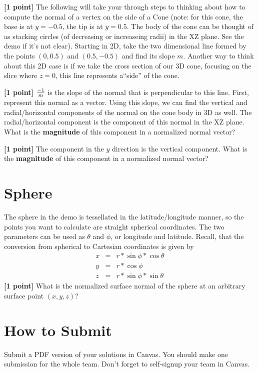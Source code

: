 \documentclass[10pt,twocolumn]{article}
\begin{document}
{\bf [1 point]} The following will take your through steps to thinking about how to compute the normal of a vertex on the side of a Cone (note: for this cone, the base is at $y=-0.5$, the tip is at $y=0.5$. The body of the cone can be thought of as stacking circles (of decreasing or increaseing radii) in the XZ plane. See the demo if it's not clear). Starting in 2D, take the two dimensional line formed by the points $(0, 0.5)$ and $(0.5, -0.5)$ and find its slope $m$. Another way to think about this 2D case is if we take the cross section of our 3D cone, focusing on the slice where $z=0$, this line represents a``side'' of the cone.
\begin{framed}
\vspace{6em}
\end{framed}


{\bf [1 point]} ${{-1}\over{m}}$ is the slope of the normal that is perpendicular to this line. First, represent this normal as a vector. Using this slope, we can find the vertical and radial/horizontal components of the normal on the cone body in 3D as well. The radial/horizontal component is the component of this normal in the XZ plane. What is the {\bf magnitude} of this component in a normalized normal vector?
\begin{framed}
\vspace{6em}
\end{framed}


{\bf [1 point]} The component in the $y$ direction is the vertical component. What is the {\bf magnitude} of this component in a normalized normal vector?
\begin{framed}
\vspace{6em}
\end{framed}


\section{Sphere}
The sphere in the demo is tessellated in the latitude/longitude manner, so the points you want to calculate are straight spherical coordinates. The two parameters can be used as $\theta$ and $\phi$, or longitude and latitude. Recall, that the conversion from spherical to Cartesian coordinates is given by
\begin{eqnarray*}
x & = & r * \sin{\phi} * \cos{\theta}\\
y & = & r * \cos{\phi}\\
z & = & r * \sin{\phi}*\sin{\theta}
\end{eqnarray*}
{\bf [1 point]} What is the normalized surface normal of the sphere at an arbitrary surface point $(x,y,z)$?
\begin{framed}
\vspace{6em}
\end{framed}


\section{How to Submit}

Submit a PDF version of your solutions in Canvas. You should make one submission for the whole team. Don't forget to self-signup your team in Canvas.
\end{document}
